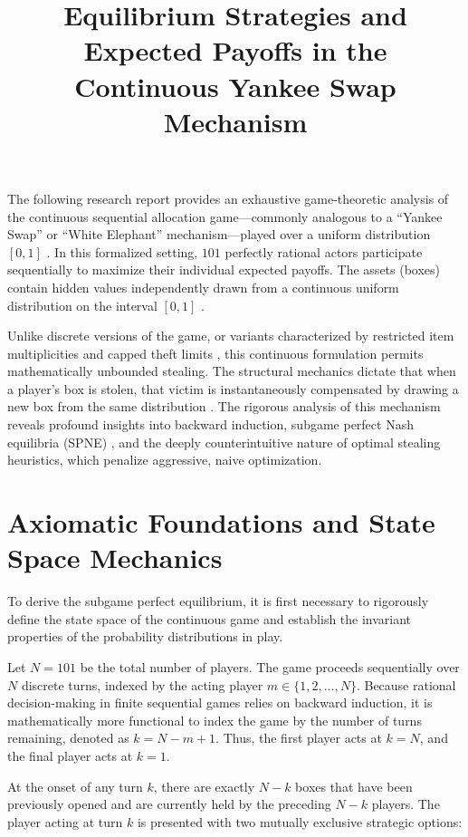 \documentclass{article}
\title{Equilibrium Strategies and Expected Payoffs in the Continuous Yankee Swap Mechanism}
\date{}
\begin{document}
\maketitle

The following research report provides an exhaustive game-theoretic analysis of the continuous sequential allocation game—commonly analogous to a ``Yankee Swap'' or ``White Elephant'' mechanism—played over a uniform distribution $[0,1]$ . In this formalized setting, $101$ perfectly rational actors participate sequentially to maximize their individual expected payoffs. The assets (boxes) contain hidden values independently drawn from a continuous uniform distribution on the interval $[0,1]$ .

Unlike discrete versions of the game, or variants characterized by restricted item multiplicities and capped theft limits , this continuous formulation permits mathematically unbounded stealing. The structural mechanics dictate that when a player's box is stolen, that victim is instantaneously compensated by drawing a new box from the same distribution . The rigorous analysis of this mechanism reveals profound insights into backward induction, subgame perfect Nash equilibria (SPNE) , and the deeply counterintuitive nature of optimal stealing heuristics, which penalize aggressive, naive optimization.

\section{Axiomatic Foundations and State Space Mechanics}

To derive the subgame perfect equilibrium, it is first necessary to rigorously define the state space of the continuous game and establish the invariant properties of the probability distributions in play.

Let $N = 101$ be the total number of players.
The game proceeds sequentially over $N$ discrete turns, indexed by the acting player $m \in \{1, 2, \ldots, N\}$.
Because rational decision-making in finite sequential games relies on backward induction, it is mathematically more functional to index the game by the number of turns remaining, denoted as $k = N - m + 1$.
Thus, the first player acts at $k=N$, and the final player acts at $k=1$.


At the onset of any turn $k$, there are exactly $N - k$ boxes that have been previously opened and are currently held by the preceding $N - k$ players.
The player acting at turn $k$ is presented with two mutually exclusive strategic options:
\end{document}
